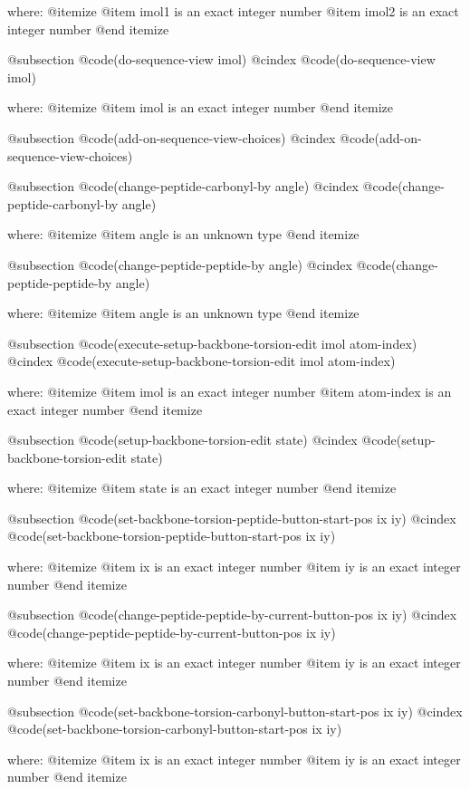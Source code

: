 where: 
 @itemize 
     @item imol1 is an exact integer number
     @item imol2 is an exact integer number
 @end itemize


@subsection @code{(do-sequence-view imol)}
@cindex @code{(do-sequence-view imol)}
 
where: 
 @itemize 
     @item imol is an exact integer number
 @end itemize


@subsection @code{(add-on-sequence-view-choices)}
@cindex @code{(add-on-sequence-view-choices)}
 
@subsection @code{(change-peptide-carbonyl-by angle)}
@cindex @code{(change-peptide-carbonyl-by angle)}
 
where: 
 @itemize 
     @item angle is an unknown type
 @end itemize


@subsection @code{(change-peptide-peptide-by angle)}
@cindex @code{(change-peptide-peptide-by angle)}
 
where: 
 @itemize 
     @item angle is an unknown type
 @end itemize


@subsection @code{(execute-setup-backbone-torsion-edit imol atom-index)}
@cindex @code{(execute-setup-backbone-torsion-edit imol atom-index)}
 
where: 
 @itemize 
     @item imol is an exact integer number
     @item atom-index is an exact integer number
 @end itemize


@subsection @code{(setup-backbone-torsion-edit state)}
@cindex @code{(setup-backbone-torsion-edit state)}
 
where: 
 @itemize 
     @item state is an exact integer number
 @end itemize


@subsection @code{(set-backbone-torsion-peptide-button-start-pos ix iy)}
@cindex @code{(set-backbone-torsion-peptide-button-start-pos ix iy)}
 
where: 
 @itemize 
     @item ix is an exact integer number
     @item iy is an exact integer number
 @end itemize


@subsection @code{(change-peptide-peptide-by-current-button-pos ix iy)}
@cindex @code{(change-peptide-peptide-by-current-button-pos ix iy)}
 
where: 
 @itemize 
     @item ix is an exact integer number
     @item iy is an exact integer number
 @end itemize


@subsection @code{(set-backbone-torsion-carbonyl-button-start-pos ix iy)}
@cindex @code{(set-backbone-torsion-carbonyl-button-start-pos ix iy)}
 
where: 
 @itemize 
     @item ix is an exact integer number
     @item iy is an exact integer number
 @end itemize


